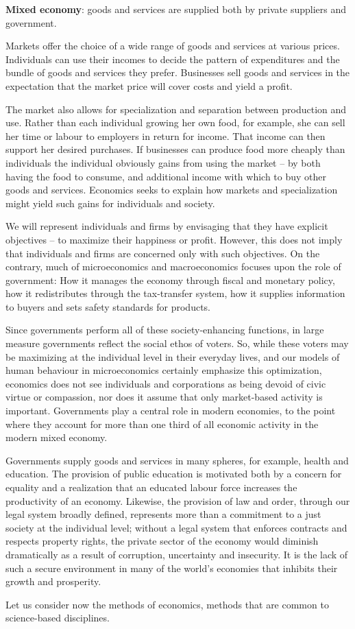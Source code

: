 \begin{DefBox}
	\textbf{Mixed economy}: goods and services are supplied both by private suppliers and government.
\end{DefBox}

Markets offer the choice of a wide range of goods and services at various
prices. Individuals can use their incomes to decide the pattern of
expenditures and the bundle of goods and services they prefer. Businesses
sell goods and services in the expectation that the market price will cover
costs and yield a profit.

The market also allows for specialization and separation between production
and use. Rather than each individual growing her own food, for example, she
can sell her time or labour to employers in return for income. That income
can then support her desired purchases. If businesses can produce food more
cheaply than individuals the individual obviously gains from using the
market -- by both having the food to consume, and additional income with
which to buy other goods and services. Economics seeks to explain how
markets and specialization might yield such gains for individuals and
society.

We will represent individuals and firms by envisaging that they have
explicit objectives -- to maximize their happiness or profit. However, this
does not imply that individuals and firms are concerned only with such
objectives. On the contrary, much of microeconomics and macroeconomics
focuses upon the role of government: How it manages the economy through
fiscal and monetary policy, how it redistributes through the tax-transfer
system, how it supplies information to buyers and sets safety standards for
products.

\newhtmlpage

Since governments perform all of these society-enhancing functions, in
large measure governments reflect the social ethos of voters. So, while
these voters may be maximizing at the individual level in their everyday
lives, and our models of human behaviour in microeconomics certainly
emphasize this optimization, economics does not see individuals and
corporations as being devoid of civic virtue or compassion, nor does it
assume that only market-based activity is important. Governments play a
central role in modern economies, to the point where they account for more
than one third of all economic activity in the modern mixed economy.

Governments supply goods and services in many spheres, for example, health
and education. The provision of public education is motivated both by a
concern for equality and a realization that an educated labour force
increases the productivity of an economy. Likewise, the provision of law and
order, through our legal system broadly defined, represents more than a
commitment to a just society at the individual level; without a legal system
that enforces contracts and respects property rights, the private sector of
the economy would diminish dramatically as a result of corruption,
uncertainty and insecurity. It is the lack of such a secure environment in
many of the world's economies that inhibits their growth and prosperity.

Let us consider now the methods of economics, methods that are common to
science-based disciplines.